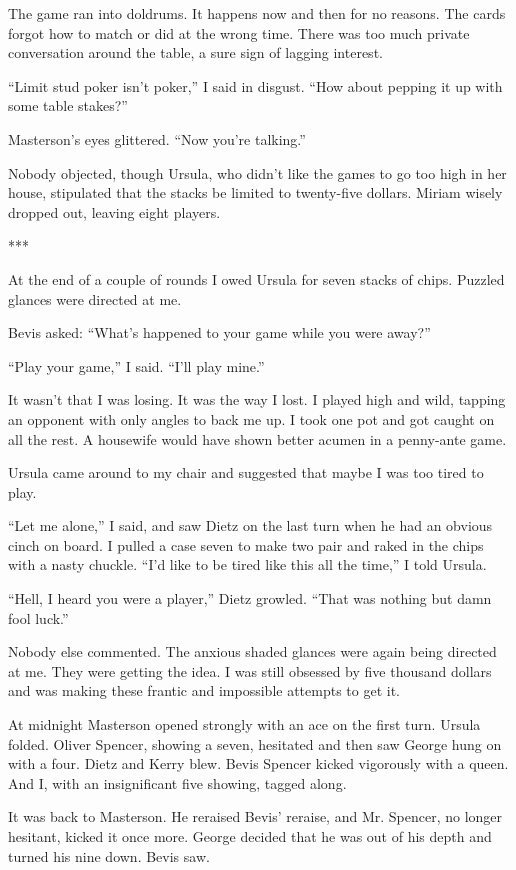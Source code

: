 \documentclass{novel}
\begin{document}
The game ran into doldrums. It happens now and then for no reasons. The cards forgot how to match or did at the wrong time. There was too much private conversation around the table, a sure sign of lagging interest.

“Limit stud poker isn’t poker,” I said in disgust. “How about pepping it up with some table stakes?”

Masterson’s eyes glittered. “Now you’re talking.”

Nobody objected, though Ursula, who didn’t like the games to go too high in her house, stipulated that the stacks be limited to twenty-five dollars. Miriam wisely dropped out, leaving eight players.

***

At the end of a couple of rounds I owed Ursula for seven stacks of chips. Puzzled glances were directed at me.

Bevis asked: “What’s happened to your game while you were away?”

“Play your game,” I said. “I’ll play mine.”

It wasn’t that I was losing. It was the way I lost. I played high and wild, tapping an opponent with only angles to back me up. I took one pot and got caught on all the rest. A housewife would have shown better acumen in a penny-ante game.

Ursula came around to my chair and suggested that maybe I was too tired to play.

“Let me alone,” I said, and saw Dietz on the last turn when he had an obvious cinch on board. I pulled a case seven to make two pair and raked in the chips with a nasty chuckle. “I’d like to be tired like this all the time,” I told Ursula.

“Hell, I heard you were a player,” Dietz growled. “That was nothing but damn fool luck.”

Nobody else commented. The anxious shaded glances were again being directed at me. They were getting the idea. I was still obsessed by five thousand dollars and was making these frantic and impossible attempts to get it.

At midnight Masterson opened strongly with an ace on the first turn. Ursula folded. Oliver Spencer, showing a seven, hesitated and then saw George hung on with a four. Dietz and Kerry blew. Bevis Spencer kicked vigorously with a queen. And I, with an insignificant five showing, tagged along.

It was back to Masterson. He reraised Bevis’ reraise, and Mr. Spencer, no longer hesitant, kicked it once more. George decided that he was out of his depth and turned his nine down. Bevis saw.
\end{document}
